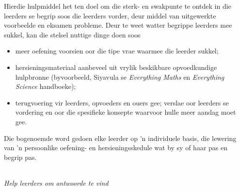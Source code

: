{%
Hierdie hulpmiddel het ten doel om die sterk- en swakpunte te ontdek in die leerders se begrip soos die leerders vorder, deur middel van uitgewerkte voorbeelde en eksamen probleme. Deur te weet watter begrippe leerders mee sukkel, kan die stelsel nuttige dinge doen soos 
\begin{itemize}[noitemsep]
\item meer oefening voorsien oor die tipe vrae waarmee die leerder sukkel;
\item hersieningsmateriaal  aanbeveel uit vrylik beskikbare opvoedkundige hulpbronne (byvoorbeeld, Siyavula se \textit{Everything Maths} en \textit{Everything Science} handboeke);
\item terugvoering vir leerders, opvoeders en ouers gee; verslae oor leerders se vordering en oor die spesifieke konsepte waarvoor hulle meer aandag moet gee. 
\end{itemize}
Die bogenoemde word gedoen elke leerder op 'n individuele basis, die lewering van 'n persoonlike oefening- en hersieningsskedule wat by sy of haar pas en begrip pas. \par




\vspace*{1cm}
}
\\
{\normalfont\sffamily\fontsize{22}\normalfont\itshape Help leerders om antwoorde te vind} \par

